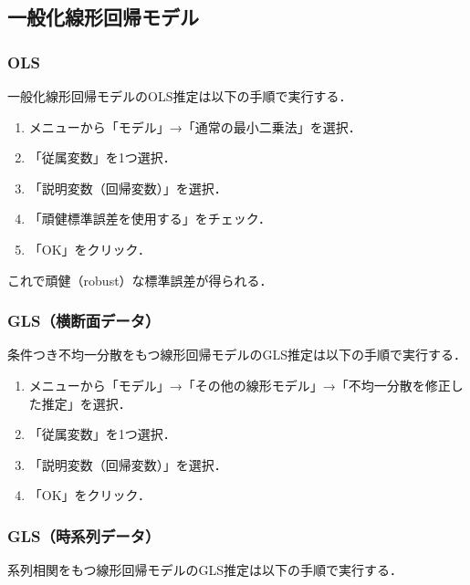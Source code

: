 \documentclass[
]{jlreq}
\providecommand{\tightlist}{%
  \setlength{\itemsep}{0pt}\setlength{\parskip}{0pt}}
\begin{document}
\subsection{一般化線形回帰モデル}\label{ux4e00ux822cux5316ux7ddaux5f62ux56deux5e30ux30e2ux30c7ux30eb}

\subsubsection{OLS}\label{ols}

一般化線形回帰モデルのOLS推定は以下の手順で実行する．

\begin{enumerate}
\def\labelenumi{\arabic{enumi}.}
\tightlist
\item
  メニューから「モデル」→「通常の最小二乗法」を選択．
\item
  「従属変数」を1つ選択．
\item
  「説明変数（回帰変数）」を選択．
\item
  「頑健標準誤差を使用する」をチェック．
\item
  「OK」をクリック．
\end{enumerate}

これで頑健（robust）な標準誤差が得られる．

\subsubsection{GLS（横断面データ）}\label{glsux6a2aux65adux9762ux30c7ux30fcux30bf}

条件つき不均一分散をもつ線形回帰モデルのGLS推定は以下の手順で実行する．

\begin{enumerate}
\def\labelenumi{\arabic{enumi}.}
\tightlist
\item
  メニューから「モデル」→「その他の線形モデル」→「不均一分散を修正した推定」を選択．
\item
  「従属変数」を1つ選択．
\item
  「説明変数（回帰変数）」を選択．
\item
  「OK」をクリック．
\end{enumerate}

\subsubsection{GLS（時系列データ）}\label{glsux6642ux7cfbux5217ux30c7ux30fcux30bf}

系列相関をもつ線形回帰モデルのGLS推定は以下の手順で実行する．
\end{document}
